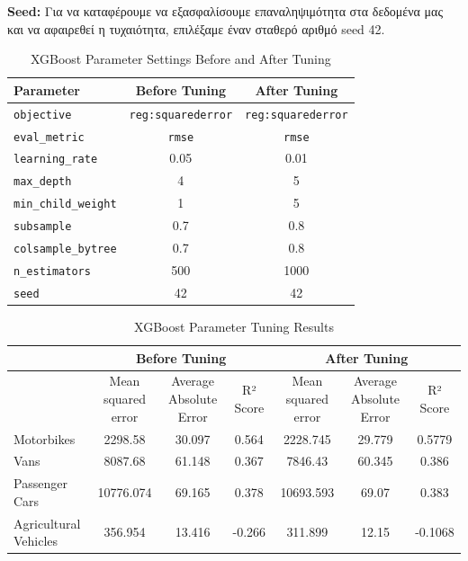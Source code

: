 \documentclass{llncs}
\begin{document}
\noindent \textbf{Seed:}
Για να καταφέρουμε να εξασφαλίσουμε επαναληψιμότητα στα δεδομένα μας και να αφαιρεθεί η τυχαιότητα, επιλέξαμε έναν σταθερό αριθμό seed 42. \\

\begin{table}[h!]
    \centering
    \begin{tabular}{l|cc}
        \hline
        Parameter & Before Tuning & After Tuning \\
        \hline
        \texttt{objective} & \texttt{reg:squarederror} & \texttt{reg:squarederror} \\
        \texttt{eval\_metric} & \texttt{rmse} & \texttt{rmse} \\
        \texttt{learning\_rate} & 0.05 & 0.01 \\
        \texttt{max\_depth} & 4 & 5 \\
        \texttt{min\_child\_weight} & 1 & 5 \\
        \texttt{subsample} & 0.7 & 0.8 \\
        \texttt{colsample\_bytree} & 0.7 & 0.8 \\
        \texttt{n\_estimators} & 500 & 1000 \\
        \texttt{seed} & 42 & 42 \\
        \hline
    \end{tabular}
    \caption{XGBoost Parameter Settings Before and After Tuning}
\end{table}

\begin{table}[h!]
    \centering
    \begin{tabular}{lccc|ccc}
        \hline
        & \multicolumn{3}{c}{Before Tuning} & \multicolumn{3}{c}{After Tuning} \\
        \hline
        & Mean squared error & Average Absolute Error & R² Score & Mean squared error & Average Absolute Error & R² Score \\
        \hline
        Motorbikes & 2298.58 & 30.097 & 0.564 & 2228.745 & 29.779 & 0.5779 \\
        Vans & 8087.68 & 61.148 & 0.367 & 7846.43 & 60.345 & 0.386 \\
        Passenger Cars & 10776.074 & 69.165 & 0.378 & 10693.593 & 69.07 & 0.383 \\
        Agricultural Vehicles & 356.954 & 13.416 & -0.266 & 311.899 & 12.15 & -0.1068 \\
        \hline
    \end{tabular}
    \caption{XGBoost Parameter Tuning Results}
\end{table}
\end{document}
